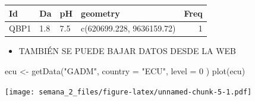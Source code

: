 \documentclass[
]{article}
\newenvironment{Shaded}{\begin{snugshade}}{\end{snugshade}}
\newcommand{\AttributeTok}[1]{\textcolor[rgb]{0.77,0.63,0.00}{#1}}
\newcommand{\DecValTok}[1]{\textcolor[rgb]{0.00,0.00,0.81}{#1}}
\newcommand{\FunctionTok}[1]{\textcolor[rgb]{0.00,0.00,0.00}{#1}}
\newcommand{\NormalTok}[1]{#1}
\newcommand{\OtherTok}[1]{\textcolor[rgb]{0.56,0.35,0.01}{#1}}
\newcommand{\StringTok}[1]{\textcolor[rgb]{0.31,0.60,0.02}{#1}}
\providecommand{\tightlist}{%
  \setlength{\itemsep}{0pt}\setlength{\parskip}{0pt}}
\begin{document}
\begin{longtable}[]{@{}llllr@{}}
\toprule
Id & Da & pH & geometry & Freq \\
\midrule
\endhead
QBP1 & 1.8 & 7.5 & c(620699.228, 9636159.72) & 1 \\
\bottomrule
\end{longtable}

\begin{itemize}
\tightlist
\item
  TAMBIÉN SE PUEDE BAJAR DATOS DESDE LA WEB
\end{itemize}

\begin{Shaded}
\begin{Highlighting}[]
\NormalTok{ecu }\OtherTok{\textless{}{-}} \FunctionTok{getData}\NormalTok{(}\StringTok{"GADM"}\NormalTok{, }\AttributeTok{country =} \StringTok{"ECU"}\NormalTok{, }\AttributeTok{level =}  \DecValTok{0}\NormalTok{ )}
\FunctionTok{plot}\NormalTok{(ecu)}
\end{Highlighting}
\end{Shaded}

\texttt{[image: semana\_2\_files/figure-latex/unnamed-chunk-5-1.pdf]}
\end{document}
